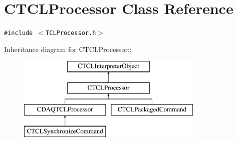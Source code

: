 \section{CTCLProcessor  Class Reference}
\label{classCTCLProcessor}
{\tt \#include $<$TCLProcessor.h$>$}

Inheritance diagram for CTCLProcessor::\begin{figure}[H]
\begin{center}
\leavevmode
\includegraphics[height=4cm]{classCTCLProcessor}
\end{center}
\end{figure}
